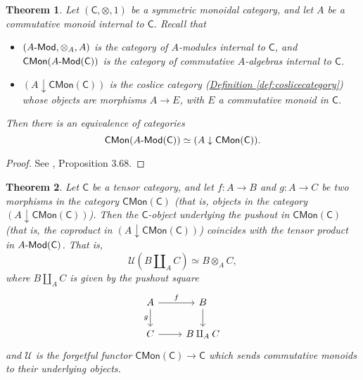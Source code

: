 \documentclass[a4paper,10pt]{scrreprt}
\def\mhyp{{\hbox{-}}}
\theoremstyle{definition}
\theoremstyle{plain}
\newtheorem{theorem}{Theorem}[section]
\theoremstyle{remark}
\begin{document}
\begin{theorem}
  \label{thm:modulesandmonoidsequivalenceofcategories}
  Let $(\mathsf{C}, \otimes, 1)$ be a symmetric monoidal category, and let $A$ be a commutative monoid internal to $\mathsf{C}$. Recall that
  \begin{itemize}
    \item $(A\mhyp\mathsf{Mod}, \otimes_{A}, A)$ is the category of $A$-modules internal to $\mathsf{C}$, and $\mathsf{CMon}(A\mhyp\mathsf{Mod}(\mathsf{C}))$ is the category of commutative $A$-algebras internal to $\mathsf{C}$.

    \item $(A \downarrow\mathsf{CMon}(\mathsf{C}))$ is the coslice category (\hyperref[def:coslicecategory]{Definition \ref*{def:coslicecategory}}) whose objects are morphisms $A \to E$, with $E$ a commutative monoid in $\mathsf{C}$.
  \end{itemize}

  Then there is an equivalence of categories
  \begin{equation*}
    \mathsf{CMon}(A\mhyp\mathsf{Mod}(\mathsf{C})) \simeq (A \downarrow\mathsf{CMon}(\mathsf{C})).
  \end{equation*}
\end{theorem}
\begin{proof}
  See \cite{nlab-deligne-theorem}, Proposition 3.68.
\end{proof}

\begin{theorem}
  \label{thm:tensorproductofcommutativemonoidsispushout}
  Let $\mathsf{C}$ be a tensor category, and let $f\colon A \to B$ and $g\colon A \to C$ be two morphisms in the category $\mathsf{CMon}(\mathsf{C})$ (that is, objects in the category $(A \downarrow\mathsf{CMon}(\mathsf{C}))$). Then the $\mathsf{C}$-object underlying the pushout in $\mathsf{CMon}(\mathsf{C})$ (that is, the coproduct in $(A \downarrow\mathsf{CMon}(\mathsf{C}))$) coincides with the tensor product in $A\mhyp\mathsf{Mod}(\mathsf{C})$. That is, 
  \begin{equation*}
    \mathcal{U}\left( B \amalg_{A} C \right) \simeq B \otimes_{A} C,
  \end{equation*}
  where $B \amalg_{A} C$ is given by the pushout square 
  \begin{equation*}
    \begin{tikzcd}
      A 
      \arrow[r, "f"]
      \arrow[d, swap, "g"]
      & B
      \arrow[d]
      \\
      C
      \arrow[r]
      & B \amalg_{A} C
    \end{tikzcd}
  \end{equation*}
  and $\mathcal{U}$ is the forgetful functor $\mathsf{CMon}(\mathsf{C}) \to \mathsf{C}$ which sends commutative monoids to their underlying objects.
\end{theorem}
\end{document}
